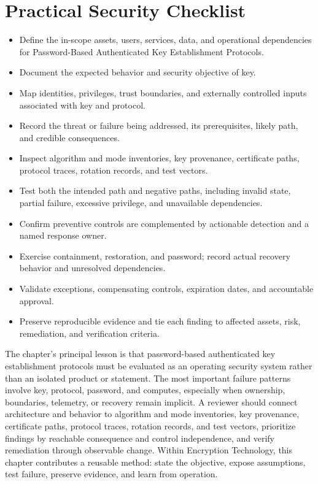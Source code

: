 \documentclass[11pt]{article}
\begin{document}
\section*{Practical Security Checklist}
\begin{itemize}[label=$\square$]
\item Define the in-scope assets, users, services, data, and operational dependencies for Password-Based Authenticated Key Establishment Protocols.
\item Document the expected behavior and security objective of key.
\item Map identities, privileges, trust boundaries, and externally controlled inputs associated with key and protocol.
\item Record the threat or failure being addressed, its prerequisites, likely path, and credible consequences.
\item Inspect algorithm and mode inventories, key provenance, certificate paths, protocol traces, rotation records, and test vectors.
\item Test both the intended path and negative paths, including invalid state, partial failure, excessive privilege, and unavailable dependencies.
\item Confirm preventive controls are complemented by actionable detection and a named response owner.
\item Exercise containment, restoration, and password; record actual recovery behavior and unresolved dependencies.
\item Validate exceptions, compensating controls, expiration dates, and accountable approval.
\item Preserve reproducible evidence and tie each finding to affected assets, risk, remediation, and verification criteria.
\end{itemize}
\begin{synthesisbox}
The chapter's principal lesson is that password-based authenticated key establishment protocols must be evaluated as an operating security system rather than an isolated product or statement. The most important failure patterns involve key, protocol, password, and computes, especially when ownership, boundaries, telemetry, or recovery remain implicit. A reviewer should connect architecture and behavior to algorithm and mode inventories, key provenance, certificate paths, protocol traces, rotation records, and test vectors, prioritize findings by reachable consequence and control independence, and verify remediation through observable change. Within Encryption Technology, this chapter contributes a reusable method: state the objective, expose assumptions, test failure, preserve evidence, and learn from operation.
\end{synthesisbox}
\end{document}
